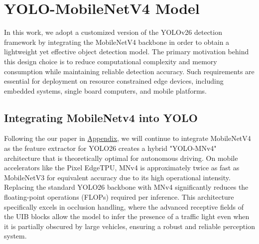 






\section{YOLO-MobileNetV4 Model}

In this work, we adopt a customized version of the YOLOv26 detection framework by integrating the MobileNetV4 backbone in order to obtain a lightweight yet effective object detection model. The primary motivation behind this design choice is to reduce computational complexity and memory consumption while maintaining reliable detection accuracy. Such requirements are essential for deployment on resource constrained edge devices, including embedded systems, single board computers, and mobile platforms.

\subsection{Integrating MobileNetv4 into YOLO}

Following the our paper in \hyperref[chap:append]{Appendix}, we will continue to integrate MobileNetV4 as the feature extractor for YOLO26 creates a hybrid "YOLO-MNv4" architecture that is theoretically optimal for autonomous driving. On mobile accelerators like the Pixel EdgeTPU, MNv4 is approximately twice as fast as MobileNetV3 for equivalent accuracy due to its high operational intensity. Replacing the standard YOLO26 backbone with MNv4 significantly reduces the floating-point operations (FLOPs) required per inference. This architecture specifically excels in occlusion handling, where the advanced receptive fields of the UIB blocks allow the model to infer the presence of a traffic light even when it is partially obscured by large vehicles, ensuring a robust and reliable perception system.

